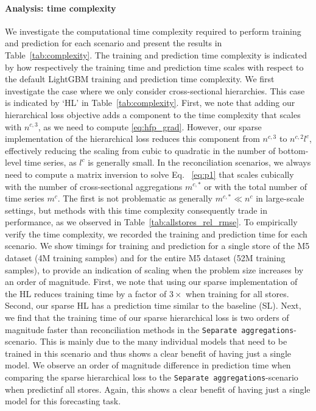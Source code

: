 \documentclass[preprint, 3p, times, twocolumn]{elsarticle}
\begin{document}
  \paragraph{Analysis: time complexity} We investigate the computational time complexity required to perform training and prediction for each scenario and present the results in Table~\ref{tab:complexity}. The training and prediction time complexity is indicated by how respectively the training time and prediction time scales with respect to the default LightGBM training and prediction time complexity. We first investigate the case where we only consider cross-sectional hierarchies. This case is indicated by `HL' in Table~\ref{tab:complexity}. First, we note that adding our hierarchical loss objective adds a component to the time complexity that scales with \(n^{c,3}\), as we need to compute \eqref{eq:hfp_grad}. However, our sparse implementation of the hierarchical loss reduces this component from \(n^{c,3}\) to \(n^{c,2}l^c\), effectively reducing the scaling from cubic to quadratic in the number of bottom-level time series, as \(l^c\) is generally small. In the reconciliation scenarios, we always need to compute a matrix inversion to solve Eq.~ \eqref{eq:p1} that scales cubically with the number of cross-sectional aggregations \(m^{c,*}\) or with the total number of time series \(m^c\). The first is not problematic as generally \(m^{c,*} \ll n^c\) in large-scale settings, but methods with this time complexity consequently trade in performance, as we observed in Table~\ref{tab:allstores_rel_rmse}. To empirically verify the time complexity, we recorded the training and prediction time for each scenario. We show timings for training and prediction for a single store of the M5 dataset (4M training samples) and for the entire M5 dataset (52M training samples), to provide an indication of scaling when the problem size increases by an order of magnitude. First, we note that using our sparse implementation of the HL reduces training time by a factor of \(3\times\) when training for all stores. Second, our sparse HL has a prediction time similar to the baseline (SL). 
  Next, we find that the training time of our sparse hierarchical loss is two orders of magnitude faster than reconciliation methods in the \texttt{Separate aggregations}-scenario. This is mainly due to the many individual models that need to be trained in this scenario and thus shows a clear benefit of having just a single model. We observe an order of magnitude difference in prediction time when comparing the sparse hierarchical loss to the \texttt{Separate aggregations}-scenario when predictinf all stores. Again, this shows a clear benefit of having just a single model for this forecasting task. 
\end{document}
